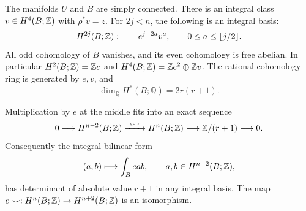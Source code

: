 \begin{lemma}\label{geo:gysin}
The manifolds $U$ and $B$ are simply connected.  There is an
integral class $v\in H^4(B;\mathbb Z)$ with $\rho^*v=z$.
For $2j<n$, the following is an integral basis:
\begin{equation}\label{geo:low-basis}
 H^{2j}(B;\mathbb Z):\qquad
 e^{j-2a}v^a,\qquad 0\le a\le\lfloor j/2\rfloor.
\end{equation}
All odd cohomology of $B$ vanishes, and its even cohomology is free
abelian.  In particular $H^2(B;\mathbb Z)=\mathbb Z e$ and
$H^4(B;\mathbb Z)=\mathbb Z e^2\oplus\mathbb Z v$.
The rational cohomology ring is generated by $e,v$, and
\begin{equation}\label{geo:total-betti}
 \dim_{\mathbb Q}H^*(B;\mathbb Q)=2r(r+1).
\end{equation}

Multiplication by $e$ at the middle fits into an exact sequence
\begin{equation}\label{geo:middle-sequence}
 0\longrightarrow H^{n-2}(B;\mathbb Z)
 \xrightarrow{\ e\smile\ }H^n(B;\mathbb Z)
 \longrightarrow\mathbb Z/(r+1)\longrightarrow0.
\end{equation}
Consequently the integral bilinear form
\begin{equation}\label{geo:middle-form}
 (a,b)\longmapsto\int_B eab,\qquad a,b\in H^{n-2}(B;\mathbb Z),
\end{equation}
has determinant of absolute value $r+1$ in any integral basis.
The map $e\smile:H^n(B;\mathbb Z)\to H^{n+2}(B;\mathbb Z)$ is an
isomorphism.
\end{lemma}


